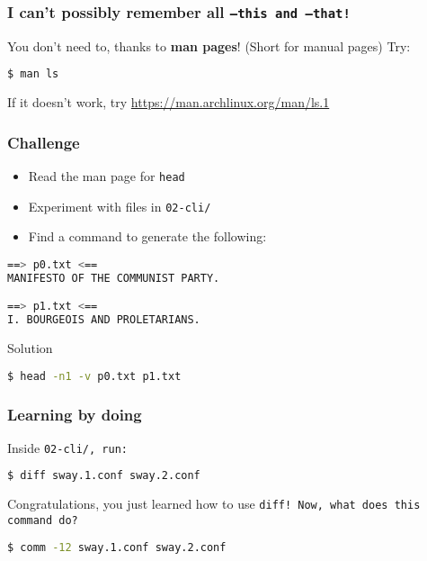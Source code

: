 \begin{frame}[fragile]
\frametitle{I can't possibly remember all \tt{--this} and \tt{--that}!}
You don't need to, thanks to \textbf{man pages}! (Short for manual pages)
\newline \newline
Try:
\begin{lstlisting}[language=bash]
$ man ls
\end{lstlisting}

If it doesn't work, try \url{https://man.archlinux.org/man/ls.1}
\end{frame}

\begin{frame}[fragile]
\frametitle{Challenge}
\begin{itemize}
    \item Read the man page for \tt{head}
    \item Experiment with files in \tt{02-cli/}
    \item Find a command to generate the following:
\end{itemize}
\begin{lstlisting}[language=bash]
==> p0.txt <==
MANIFESTO OF THE COMMUNIST PARTY.

==> p1.txt <==
I. BOURGEOIS AND PROLETARIANS.
\end{lstlisting}
\pause
\begin{block}{Solution}
\begin{lstlisting}[language=bash]
$ head -n1 -v p0.txt p1.txt
\end{lstlisting}
\end{block}
\end{frame}

\begin{frame}[fragile]
\frametitle{Learning by doing}
Inside \tt{02-cli/}, run:
\begin{lstlisting}[language=bash]
$ diff sway.1.conf sway.2.conf
\end{lstlisting}
Congratulations, you just learned how to use \tt{diff}!
\newline \newline
Now, what does this command do?
\begin{lstlisting}[language=bash]
$ comm -12 sway.1.conf sway.2.conf
\end{lstlisting}
\end{frame}

